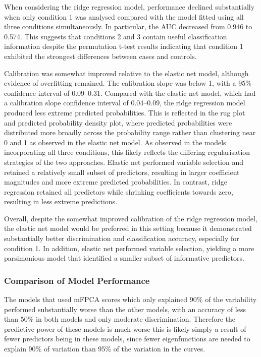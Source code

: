 \documentclass{article}
\begin{document}
When considering the ridge regression model, performance declined
substantially when only condition 1 was analysed compared with the model
fitted using all three conditions simultaneously. In particular, the AUC
decreased from 0.946 to 0.574. This suggests that conditions 2 and 3
contain useful classification information despite the permutation t-test
results indicating that condition 1 exhibited the strongest differences
between cases and controls.

Calibration was somewhat improved relative to the elastic net model,
although evidence of overfitting remained. The calibration slope was
below 1, with a 95\% confidence interval of 0.09--0.31. Compared with
the elastic net model, which had a calibration slope confidence interval
of 0.04--0.09, the ridge regression model produced less extreme
predicted probabilities. This is reflected in the rug plot and predicted
probability density plot, where predicted probabilities were distributed
more broadly across the probability range rather than clustering near 0
and 1 as observed in the elastic net model. As observed in the models
incorporating all three conditions, this likely reflects the differing
regularisation strategies of the two approaches. Elastic net performed
variable selection and retained a relatively small subset of predictors,
resulting in larger coefficient magnitudes and more extreme predicted
probabilities. In contrast, ridge regression retained all predictors
while shrinking coefficients towards zero, resulting in less extreme
predictions.

Overall, despite the somewhat improved calibration of the ridge
regression model, the elastic net model would be preferred in this
setting because it demonstrated substantially better discrimination and
classification accuracy, especially for condition 1. In addition,
elastic net performed variable selection, yielding a more parsimonious
model that identified a smaller subset of informative predictors.

\subsubsection{Comparison of Model
Performance}\label{comparison-of-model-performance}

The models that used mFPCA scores which only explained 90\% of the
variability performed substantially worse than the other models, with an
accuracy of less than 50\% in both models and only moderate
discrimination. Therefore the predictive power of these models is much
worse this is likely simply a result of fewer predictors being in these
models, since fewer eigenfunctions are needed to explain 90\% of
variation than 95\% of the variation in the curves.
\end{document}
